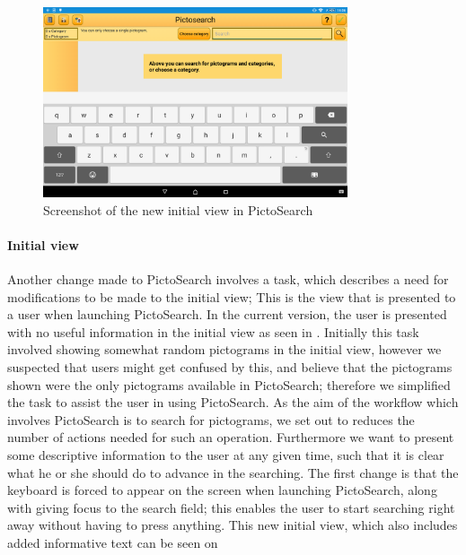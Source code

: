 \begin{figure}[h]
    \centering
    \includegraphics[width=0.8\textwidth]{figures/img/screenshots/new_startup.png}
    \caption{Screenshot of the new initial view in PictoSearch}\label{fig:screenshot_newstartup}
\end{figure}

\paragraph{Initial view}
Another change made to PictoSearch involves a task, which describes a need for modifications to be made to the initial view; This is the view that is presented to a user when launching PictoSearch.
In the current version, the user is presented with no useful information in the initial view as seen in .
Initially this task involved showing somewhat random pictograms in the initial view, however we suspected that users might get confused by this, and believe that the pictograms shown were the only pictograms available in PictoSearch; therefore we simplified the task to assist the user in using PictoSearch.
As the aim of the workflow which involves PictoSearch is to search for pictograms, we set out to reduces the number of actions needed for such an operation. 
Furthermore we want to present some descriptive information to the user at any given time, such that it is clear what he or she should do to advance in the searching.
The first change is that the keyboard is forced to appear on the screen when launching PictoSearch, along with giving focus to the search field; this enables the user to start searching right away without having to press anything.
This new initial view, which also includes added informative text can be seen on 
